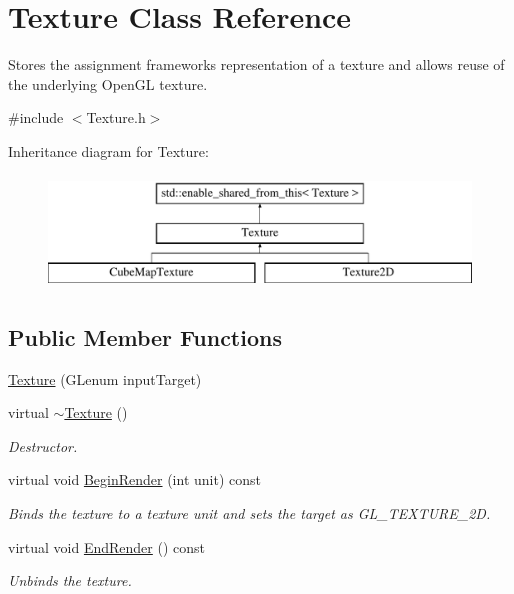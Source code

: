 \hypertarget{class_texture}{}\section{Texture Class Reference}
\label{class_texture}


Stores the assignment framework\textquotesingle{}s representation of a texture and allows reuse of the underlying Open\+GL texture.




{\ttfamily \#include $<$Texture.\+h$>$}

Inheritance diagram for Texture\+:\begin{figure}[H]
\begin{center}
\leavevmode
\includegraphics[height=3.000000cm]{class_texture}
\end{center}
\end{figure}
\subsection*{Public Member Functions}
\begin{DoxyCompactItemize}
\item
\hyperlink{class_texture_aa9661e01f3c034c259c15b619e2cea55}{Texture} (G\+Lenum input\+Target)
\item
virtual \hyperlink{class_texture_a09c4bcb7462f64c1d20fa69dba3cee8a}{$\sim$\+Texture} ()
\begin{DoxyCompactList}\small\item\em Destructor. \end{DoxyCompactList}\item
virtual void \hyperlink{class_texture_a6c9fda62e4203d0545ec0d3d0551760d}{Begin\+Render} (int unit) const
\begin{DoxyCompactList}\small\item\em Binds the texture to a texture unit and sets the target as G\+L\+\_\+\+T\+E\+X\+T\+U\+R\+E\+\_\+2D. \end{DoxyCompactList}\item
virtual void \hyperlink{class_texture_ab3fc771da58d58e1f3701b1fae12880b}{End\+Render} () const
\begin{DoxyCompactList}\small\item\em Unbinds the texture. \end{DoxyCompactList}\end{DoxyCompactItemize}
